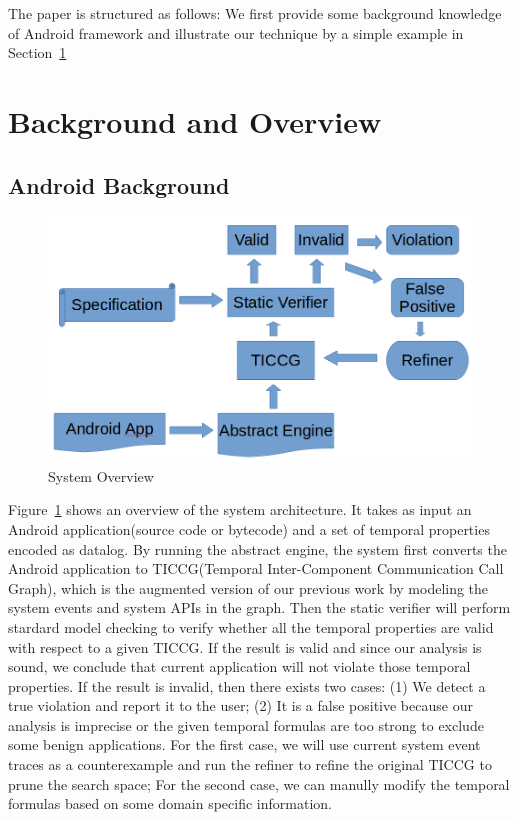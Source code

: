 \documentclass{article}
\begin{document}
The paper is structured as follows: We first provide some background knowledge of
Android framework and illustrate our technique by a simple example in Section~\ref{sec:overview}

\section{Background and Overview}
\label{sec:overview}

\subsection{Android Background}
\begin{figure}
\centerline{\includegraphics[scale=0.4]{sysgraph}}
\caption{System Overview}
\label{fig:one}
\end{figure}

Figure~\ref{fig:one} shows an overview of the system architecture.
It takes as input an Android application(source code or bytecode) 
and a set of temporal properties encoded as datalog. By running the 
abstract engine, the system first converts the Android application 
to TICCG(Temporal Inter-Component Communication Call Graph), 
which is the augmented version of our previous work\cite{apposcopy}
by modeling the system events and system APIs in the graph. 
Then the static verifier will perform stardard model checking to 
verify whether all the temporal properties are valid with respect 
to a given TICCG. If the result is valid and since our analysis is 
sound, we conclude that current application will not violate those
temporal properties. If the result is invalid, then there exists two
cases: (1) We detect a true violation and report it to the user; 
(2) It is a false positive because our analysis is imprecise or the 
given temporal formulas are too strong to exclude some benign applications.
For the first case, we will use current system event traces as a counterexample
\cite{clarkecegar} and  run the refiner to refine the original 
TICCG to prune the search space; For the second case, we can manully
modify the temporal formulas based on some domain specific information.
\end{document}
